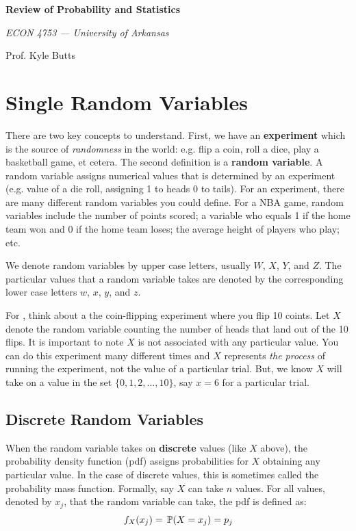 \documentclass[12pt]{article}
\begin{document}
\begin{center}
  {\Huge\bf Review of Probability and Statistics}
  
  \smallskip
  {\large\it ECON 4753 — University of Arkansas}

  \medskip
  {\large Prof. Kyle Butts}
\end{center}

\section{Single Random Variables}

There are two key concepts to understand. First, we have an \textbf{experiment} which is the source of \emph{randomness} in the world: e.g. flip a coin, roll a dice, play a basketball game, et cetera. The second definition is a \textbf{random variable}. A random variable assigns numerical values that is determined by an experiment (e.g. value of a die roll, assigning 1 to heads 0 to tails). For an experiment, there are many different random variables you could define. For a NBA game, random variables include the number of points scored; a variable who equals 1 if the home team won and 0 if the home team loses; the average height of players who play; etc. 

We denote random variables by upper case letters, usually $W$, $X$, $Y$,
and $Z$. The particular values that a random variable takes are denoted by the corresponding lower case letters $w$, $x$, $y$, and $z$.

For , think about a the coin-flipping experiment where you flip 10 coints. Let $X$ denote the random variable counting the number of heads that land out of the 10 flips. It is important to note $X$ is not associated with any particular value. You can do this experiment many different times and $X$ represents \emph{the process} of running the experiment, not the value of a particular trial. But, we know $X$ will take on a value in the set $\{ 0, 1, 2, \dots, 10 \}$, say $x = 6$ for a particular trial.


\subsection*{Discrete Random Variables}

When the random variable takes on \textbf{discrete} values (like $X$ above), the probability density function (pdf) assigns probabilities for $X$ obtaining any particular value. In the case of discrete values, this is sometimes called the probability mass function. Formally, say $X$ can take $n$ values. For all values, denoted by $x_j$, that the random variable can take, the pdf is defined as:
$$
  f_{X}(x_j) = \P{X = x_j} = p_j
$$
\end{document}
